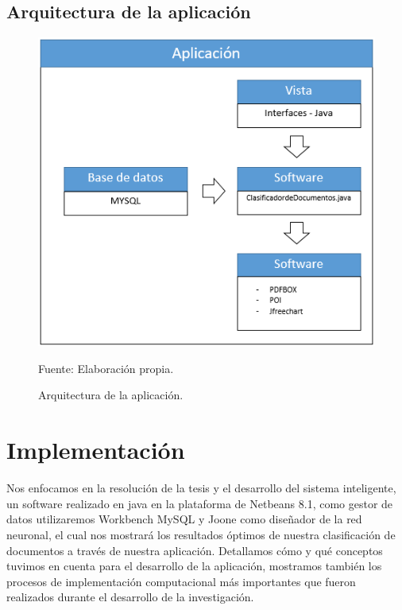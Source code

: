\subsection{Arquitectura de la aplicación}
\begin{figure}[h!]
	\centering
		\includegraphics[scale=0.4]{imagenes/arquitecturaaaa.png}
		\caption{Arquitectura de la aplicación.}
	\begin{center}
    Fuente: Elaboración propia.
    \end{center}
	\label{fig:arquitecturaaaa}
\end{figure}

\section{Implementación}
Nos enfocamos en la resolución de la tesis y el desarrollo del sistema inteligente, un software realizado en java en la plataforma de Netbeans 8.1, como gestor de datos utilizaremos Workbench MySQL y Joone como diseñador de la red neuronal, el cual nos mostrará los resultados óptimos de nuestra clasificación de documentos a través de nuestra aplicación. Detallamos cómo y qué conceptos tuvimos en cuenta para el desarrollo de la aplicación, mostramos también los procesos de implementación computacional más importantes que fueron realizados durante el desarrollo de la investigación.



